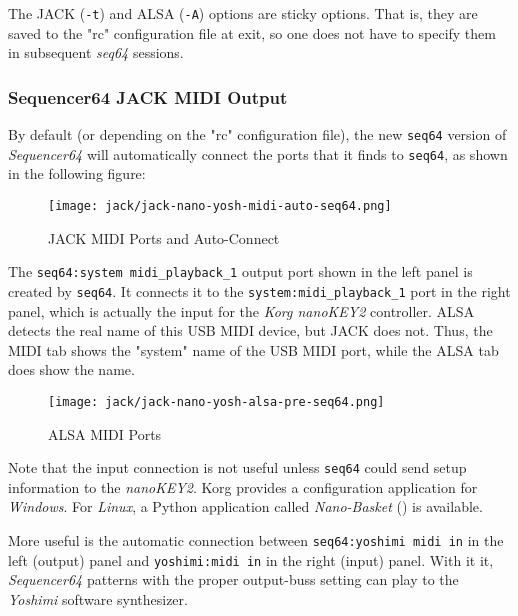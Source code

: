    The JACK (\texttt{-t}) and ALSA (\texttt{-A}) options are sticky options.
   That is, they are saved to the "rc" configuration file at exit,
   so one does not have to specify them in subsequent \textsl{seq64} sessions.

\subsubsection{Sequencer64 JACK MIDI Output}
\label{subsubsec:seq64_jack_midi_output}

   By default (or depending on the "rc" configuration file), the new
   \texttt{seq64} version of \textsl{Sequencer64} will
   automatically connect the ports that it finds to \texttt{seq64},
   as shown in the following figure:

\begin{figure}[H]
   \centering 
   \texttt{[image: jack/jack-nano-yosh-midi-auto-seq64.png]}
   \caption{JACK MIDI Ports and Auto-Connect}
   \label{fig:seq64_jack_nano_yosh_midi_auto}
\end{figure}

   The \texttt{seq64:system midi\_playback\_1} output port shown
   in the left panel is created by \texttt{seq64}.  It connects it to the 
   \texttt{system:midi\_playback\_1} port in the right panel, which
   is actually the input for the \textsl{Korg nanoKEY2} controller.
   ALSA detects the real name of this USB MIDI device, but JACK does not.  
   Thus, the MIDI tab shows the "system" name of the USB MIDI port, while
   the ALSA tab does show the name.

\begin{figure}[H]
   \centering 
   \texttt{[image: jack/jack-nano-yosh-alsa-pre-seq64.png]}
   \caption{ALSA MIDI Ports}
   \label{fig:seq64_jack_nano_yosh_alsa_pre}
\end{figure}

	Note that the input connection is not useful unless \texttt{seq64} could
   send setup information to the \textsl{nanoKEY2}.
   Korg provides a configuration application for \textsl{Windows}.
   For \textsl{Linux}, a Python application called \textsl{Nano-Basket}
	(\cite{nanobasket}) is available.

   More useful is the automatic connection between
   \texttt{seq64:yoshimi midi in} in the left (output) panel and
   \texttt{yoshimi:midi in} in the right (input) panel.  With it it,
   \textsl{Sequencer64} patterns with the proper output-buss setting can play
   to the \textsl{Yoshimi} software synthesizer.

